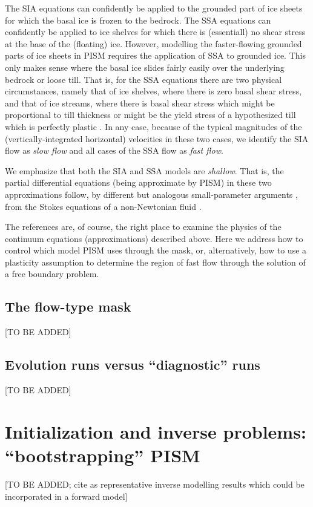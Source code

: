 \documentclass[11pt,final]{amsart}
\begin{document}
The SIA equations can confidently be applied to the grounded part of ice sheets for which the basal ice is frozen to the bedrock.  The SSA equations can confidently be applied to ice shelves for which there is (essentiall) no shear stress at the base of the (floating) ice.  However, modelling the faster-flowing grounded parts of ice sheets in PISM requires the application of SSA to grounded ice.  This only makes sense where the basal ice slides fairly easily over the underlying bedrock or loose till.  That is, for the SSA equations there are two physical circumstances, namely that of ice shelves, where there is zero basal shear stress, and that of ice streams, where there is basal shear stress which might be proportional to till thickness \cite{MacAyeal,HulbeMacAyeal} or might be the yield stress of a hypothesized till which is perfectly plastic \cite{SchoofStream}.  In any case, because of the typical magnitudes of the (vertically-integrated horizontal) velocities in these two cases, we identify the SIA flow as \emph{slow flow} and all cases of the SSA flow as \emph{fast flow}.

We emphasize that both the SIA and SSA models are \emph{shallow}.  That is, the partial differential equations (being approximate by PISM) in these two approximations follow, by different but analogous small-parameter arguments \cite[see the appendices]{SchoofStream}, from the Stokes equations of a non-Newtonian fluid \cite{Fowler}.

The references are, of course, the right place to examine the physics of the continuum equations (approximations) described above.  Here we address how to control which model PISM uses through the mask, or, alternatively, how to use a plasticity assumption to determine the region of fast flow through the solution of a free boundary problem.

\subsection{The flow-type mask} \label{subsect:mask}  [TO BE ADDED]

\subsection{Evolution runs versus ``diagnostic'' runs}  [TO BE ADDED]



\clearpage
\newpage
\section{Initialization and inverse problems: ``bootstrapping'' PISM}\label{sect:boot}  [TO BE ADDED; cite \cite{JoughinMacAyealTulaczyk} as representative inverse modelling results which could be incorporated in a forward model]
\end{document}
